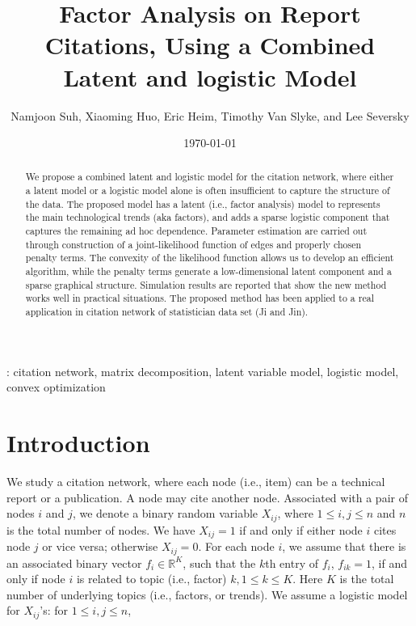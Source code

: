\documentclass{article}
\begin{document}



\title{Factor Analysis on Report Citations, Using a Combined Latent and logistic Model}
\author{Namjoon Suh, Xiaoming Huo, Eric Heim, Timothy Van Slyke, and Lee Seversky}

\date{\today}
\maketitle

\begin{abstract}
We propose a combined latent and logistic model for the citation network, where either a latent model or a logistic model alone is often insufficient to capture the structure of the data.
The proposed model has a latent (i.e., factor analysis) model to represents the main technological trends (aka factors), and adds a sparse logistic component that captures the remaining ad hoc dependence. Parameter estimation are carried out through construction of a joint-likelihood function of edges and properly chosen penalty terms. The convexity of the likelihood function allows us to develop an efficient algorithm, while the penalty terms generate a low-dimensional latent component and a sparse graphical structure. Simulation results are reported that show the new method works well in practical situations. The proposed method has been applied to a real application in citation network of statistician data set (Ji and Jin).
\end{abstract}

: citation network, matrix decomposition, latent variable model,  logistic model, convex optimization

\section{Introduction}\label{sec:intro}
We study a citation network, where each node (i.e., item) can be a technical report or a publication. A node may cite another node. Associated with a pair of nodes $i$ and $j$, we denote a binary random variable $X_{ij}$, where $1 \le i,j \le n$ and $n$ is the total number of nodes. We have $X_{ij}=1$ if and only if either node $i$ cites node $j$ or vice versa; otherwise $X_{ij}=0$. For each node $i$, we assume that there is an associated binary vector $f_{i} \in \mathbb{R}^K$, such that the $k$th entry of $f_{i}$, $f_{ik} = 1$, if and only if node $i$ is related to topic (i.e., factor) $k, 1\le k \le K$. Here $K$ is the total number of underlying topics (i.e., factors, or trends). We assume a logistic model for $X_{ij}$'s: for $1\le i,j \le n$, 
\end{document}
